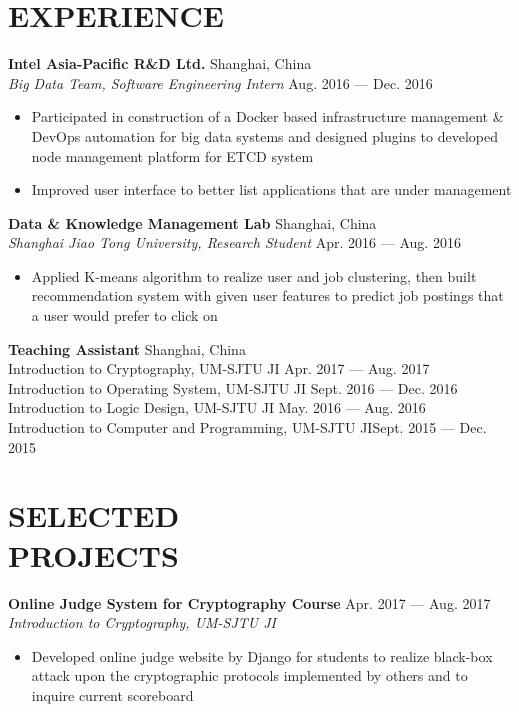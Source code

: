 \documentclass[margin,line,10pt]{res}
\begin{document}
\begin{resume}
\section{EXPERIENCE}
{\small
{\bf\normalsize Intel Asia-Pacific R\&D Ltd.} \hfill Shanghai, China \\
{\it Big Data Team, Software Engineering Intern} \hfill Aug. 2016 --- Dec. 2016
}
\begin{itemize}
\setlength{\itemsep}{0pt}
\setlength{\parskip}{0pt}
\setlength{\parsep}{0pt}
\item {\small Participated in construction of a Docker based infrastructure management \& DevOps automation for big data systems and designed plugins to developed node management platform for ETCD system}
\item {\small Improved user interface to better list applications that are under management}
\end{itemize}
\vspace{-.1 in}
{\small
{\bf\normalsize Data \& Knowledge Management Lab}   \hfill Shanghai, China\\
{\it Shanghai Jiao Tong University, Research Student} \hfill Apr. 2016 --- Aug. 2016
}
\begin{itemize}
\setlength{\itemsep}{0pt}
\setlength{\parskip}{0pt}
\setlength{\parsep}{0pt}
\item {\small Applied K-means algorithm to realize user and job clustering, then built recommendation system with given user features to predict job postings that a user would prefer to click on}
\end{itemize}
\vspace{-.1 in}
{
\small
{\bf\normalsize Teaching Assistant} \hfill Shanghai, China\\
{Introduction to Cryptography, UM-SJTU JI} \hfill Apr. 2017 --- Aug. 2017\\
{Introduction to Operating System, UM-SJTU JI} \hfill Sept. 2016 --- Dec. 2016\\
{Introduction to Logic Design, UM-SJTU JI} \hfill May. 2016 --- Aug. 2016 \\
{Introduction to Computer and Programming, UM-SJTU JI}\hfill Sept. 2015 --- Dec. 2015
}


\section{SELECTED\\PROJECTS}
{
\small
{\bf Online Judge System for Cryptography Course} \hfill Apr. 2017 --- Aug. 2017\\
{\it Introduction to Cryptography, UM-SJTU JI}
}
\begin{itemize}
\setlength{\itemsep}{0pt}
\setlength{\parskip}{0pt}
\setlength{\parsep}{0pt}
\item {\small Developed online judge website by Django for students to realize black-box attack upon the cryptographic protocols implemented by others and to inquire current scoreboard}
\end{itemize}
\vspace{-.1 in}


\end{resume}
\end{document}
